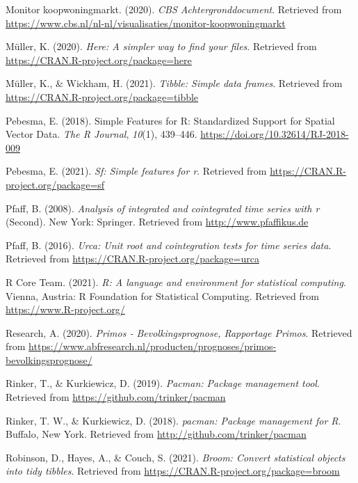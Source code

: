 \documentclass[
]{article}
\begin{document}
\leavevmode\hypertarget{ref-CBS2020}{}%
Monitor koopwoningmarkt. (2020). \emph{CBS Achtergronddocument}.
Retrieved from
\url{https://www.cbs.nl/nl-nl/visualisaties/monitor-koopwoningmarkt}

\leavevmode\hypertarget{ref-R-here}{}%
Müller, K. (2020). \emph{Here: A simpler way to find your files}.
Retrieved from \url{https://CRAN.R-project.org/package=here}

\leavevmode\hypertarget{ref-R-tibble}{}%
Müller, K., \& Wickham, H. (2021). \emph{Tibble: Simple data frames}.
Retrieved from \url{https://CRAN.R-project.org/package=tibble}

\leavevmode\hypertarget{ref-sf2018}{}%
Pebesma, E. (2018). Simple Features for R: Standardized Support for
Spatial Vector Data. \emph{The R Journal}, \emph{10}(1), 439--446.
\url{https://doi.org/10.32614/RJ-2018-009}

\leavevmode\hypertarget{ref-R-sf}{}%
Pebesma, E. (2021). \emph{Sf: Simple features for r}. Retrieved from
\url{https://CRAN.R-project.org/package=sf}

\leavevmode\hypertarget{ref-urca2008}{}%
Pfaff, B. (2008). \emph{Analysis of integrated and cointegrated time
series with r} (Second). New York: Springer. Retrieved from
\url{http://www.pfaffikus.de}

\leavevmode\hypertarget{ref-R-urca}{}%
Pfaff, B. (2016). \emph{Urca: Unit root and cointegration tests for time
series data}. Retrieved from
\url{https://CRAN.R-project.org/package=urca}

\leavevmode\hypertarget{ref-R-base}{}%
R Core Team. (2021). \emph{R: A language and environment for statistical
computing}. Vienna, Austria: R Foundation for Statistical Computing.
Retrieved from \url{https://www.R-project.org/}

\leavevmode\hypertarget{ref-Research2020}{}%
Research, A. (2020). \emph{Primos - Bevolkingsprognose, Rapportage
Primos}. Retrieved from
\url{https://www.abfresearch.nl/producten/prognoses/primos-bevolkingsprognose/}

\leavevmode\hypertarget{ref-R-pacman}{}%
Rinker, T., \& Kurkiewicz, D. (2019). \emph{Pacman: Package management
tool}. Retrieved from \url{https://github.com/trinker/pacman}

\leavevmode\hypertarget{ref-pacman2018}{}%
Rinker, T. W., \& Kurkiewicz, D. (2018). \emph{pacman: Package
management for R}. Buffalo, New York. Retrieved from
\url{http://github.com/trinker/pacman}

\leavevmode\hypertarget{ref-R-broom}{}%
Robinson, D., Hayes, A., \& Couch, S. (2021). \emph{Broom: Convert
statistical objects into tidy tibbles}. Retrieved from
\url{https://CRAN.R-project.org/package=broom}
\end{document}
